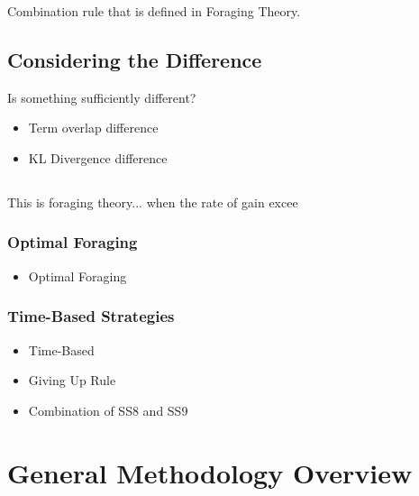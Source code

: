 Combination rule that is defined in Foraging Theory.

\subsection{Considering the Difference}
Is something sufficiently different?


\begin{itemize}
    \item[\blueboxbold{SS5}] Term overlap difference
\end{itemize}

\begin{itemize}
    \item[\blueboxbold{SS6}] KL Divergence difference
\end{itemize}

\subsection{}
This is foraging theory... when the rate of gain excee

\subsubsection{Optimal Foraging}

\begin{itemize}
    \item[\blueboxbold{SS7}] Optimal Foraging
\end{itemize}

\subsubsection{Time-Based Strategies}

\begin{itemize}
    \item[\blueboxbold{SS8}] Time-Based
\end{itemize}

\begin{itemize}
    \item[\blueboxbold{SS9}] Giving Up Rule
\end{itemize}

\begin{itemize}
    \item[\blueboxbold{SS10}] Combination of SS8 and SS9
\end{itemize}

\section{General Methodology Overview}\label{sec:proposal:method}

